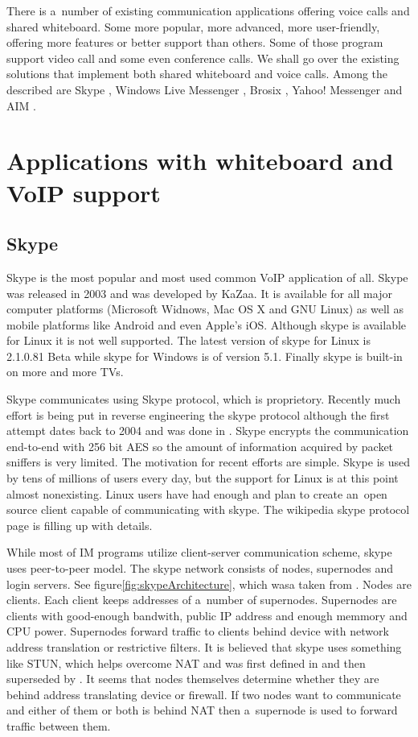 There is a~number of existing communication applications offering voice calls and shared whiteboard. Some more popular, more advanced, more user-friendly, offering more features or better support than others. Some of those program support video call and some even conference calls. We shall go over the existing solutions that implement both shared whiteboard and voice calls. Among the described are Skype \cite{skype}, Windows Live Messenger \cite{WindowsLiveMessenger}, Brosix \cite{brosix}, Yahoo! Messenger \cite{yahoo} and AIM \cite{AIM}.

\section{Applications with whiteboard and VoIP support}
\subsection*{Skype}
Skype is the most popular and most used common VoIP application of all. Skype was released in 2003 and was developed by KaZaa\cite{kazaa}. It is available for all major computer platforms (Microsoft Widnows, Mac OS X and GNU Linux) as well as mobile platforms like Android and even Apple's iOS. Although skype is available for Linux it is not well supported. The latest version of skype for Linux is 2.1.0.81 Beta while skype for Windows is of version 5.1. Finally skype is built-in on more and more TVs.

Skype communicates using Skype protocol, which is proprietory. Recently much effort is being put in reverse engineering the skype protocol although the first attempt dates back to 2004 and was done in \cite{skypeProtocolAnalysis}. Skype encrypts the communication end-to-end with 256 bit AES so the amount of information acquired by packet sniffers is very limited. The motivation for recent efforts are simple. Skype is used by tens of millions of users every day, but the support for Linux is at this point almost nonexisting. Linux users have had enough and plan to create an~open source client capable of communicating with skype. The wikipedia skype protocol page\cite{wikipediaSkypeProtocol} is filling up with details.  

While most of IM programs utilize client-server communication scheme, skype uses peer-to-peer model. The skype network consists of nodes, supernodes and login servers. See figure\ref{fig:skypeArchitecture}, which wasa taken from \cite{skypeProtocolAnalysis}. Nodes are clients. Each client keeps addresses of a~number of supernodes. Supernodes are clients with good-enough bandwith, public IP address and enough memmory and CPU power. Supernodes forward traffic to clients behind device with network address translation or restrictive filters. It is believed that skype uses something like STUN, which helps overcome NAT and was first defined in \cite{STUNRFC} and then superseded by \cite{STUNRFCNEW}. It seems that nodes themselves determine whether they are behind address translating device or firewall. If two nodes want to communicate and either of them or both is behind NAT then a~supernode is used to forward traffic between them. 

